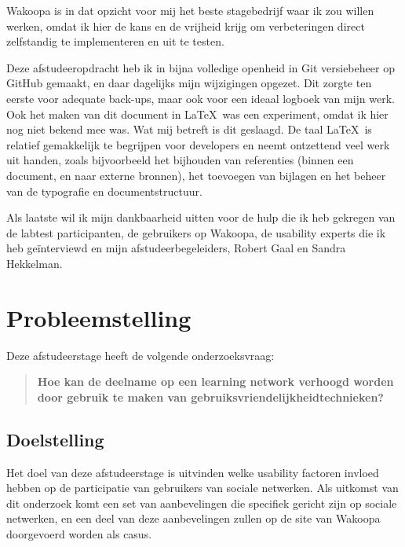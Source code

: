 \documentclass[a4paper, 10pt, pdftex]{report}
\begin{document}
    Wakoopa is in dat opzicht voor mij het beste stagebedrijf waar ik zou willen werken, omdat ik hier de kans en de vrijheid krijg om verbeteringen direct zelfstandig te implementeren en uit te testen.

    Deze afstudeeropdracht heb ik in bijna volledige openheid in Git versiebeheer op GitHub gemaakt, en daar dagelijks mijn wijzigingen opgezet. Dit zorgte ten eerste voor adequate back-ups, maar ook voor een ideaal logboek van mijn werk. Ook het maken van dit document in \LaTeX~was een experiment, omdat ik hier nog niet bekend mee was. Wat mij betreft is dit geslaagd. De taal \LaTeX~is relatief gemakkelijk te begrijpen voor developers en neemt ontzettend veel werk uit handen, zoals bijvoorbeeld het bijhouden van referenties (binnen een document, en naar externe bronnen), het toevoegen van bijlagen en het beheer van de typografie en documentstructuur.

    Als laatste wil ik mijn dankbaarheid uitten voor de hulp die ik heb gekregen van de labtest participanten, de gebruikers op Wakoopa, de usability experts die ik heb ge\"interviewd en mijn afstudeerbegeleiders, Robert Gaal en Sandra Hekkelman.

  \newpage
  \section*{Probleemstelling}
    Deze afstudeerstage heeft de volgende onderzoeksvraag:
    \begin{quotation}
     \textbf{Hoe kan de deelname op een learning network verhoogd worden door gebruik te maken van gebruiksvriendelijkheidtechnieken?}
    \end{quotation}

    \subsection*{Doelstelling}

    Het doel van deze afstudeerstage is uitvinden welke usability factoren invloed hebben op de participatie van gebruikers van sociale netwerken. Als uitkomst van dit onderzoek komt een set van aanbevelingen die specifiek gericht zijn op sociale netwerken, en een deel van deze aanbevelingen zullen op de site van Wakoopa doorgevoerd worden als casus.
\end{document}
